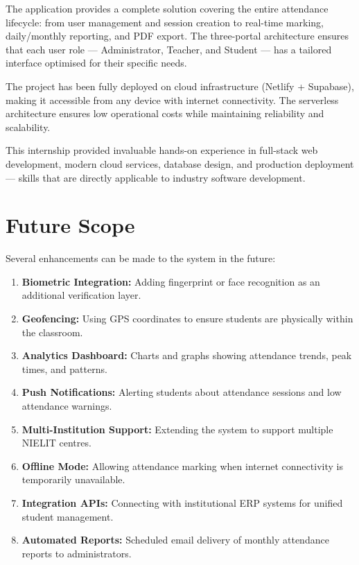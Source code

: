 \documentclass{SOICTthesis}
\begin{document}
The application provides a complete solution covering the entire attendance lifecycle: from user management and session creation to real-time marking, daily/monthly reporting, and PDF export. The three-portal architecture ensures that each user role --- Administrator, Teacher, and Student --- has a tailored interface optimised for their specific needs.

The project has been fully deployed on cloud infrastructure (Netlify + Supabase), making it accessible from any device with internet connectivity. The serverless architecture ensures low operational costs while maintaining reliability and scalability.

This internship provided invaluable hands-on experience in full-stack web development, modern cloud services, database design, and production deployment --- skills that are directly applicable to industry software development.

\section{Future Scope}
\label{sec:future_scope}

Several enhancements can be made to the system in the future:

\begin{enumerate}
    \item \textbf{Biometric Integration:} Adding fingerprint or face recognition as an additional verification layer.
    \item \textbf{Geofencing:} Using GPS coordinates to ensure students are physically within the classroom.
    \item \textbf{Analytics Dashboard:} Charts and graphs showing attendance trends, peak times, and patterns.
    \item \textbf{Push Notifications:} Alerting students about attendance sessions and low attendance warnings.
    \item \textbf{Multi-Institution Support:} Extending the system to support multiple NIELIT centres.
    \item \textbf{Offline Mode:} Allowing attendance marking when internet connectivity is temporarily unavailable.
    \item \textbf{Integration APIs:} Connecting with institutional ERP systems for unified student management.
    \item \textbf{Automated Reports:} Scheduled email delivery of monthly attendance reports to administrators.
\end{enumerate}
\end{document}
